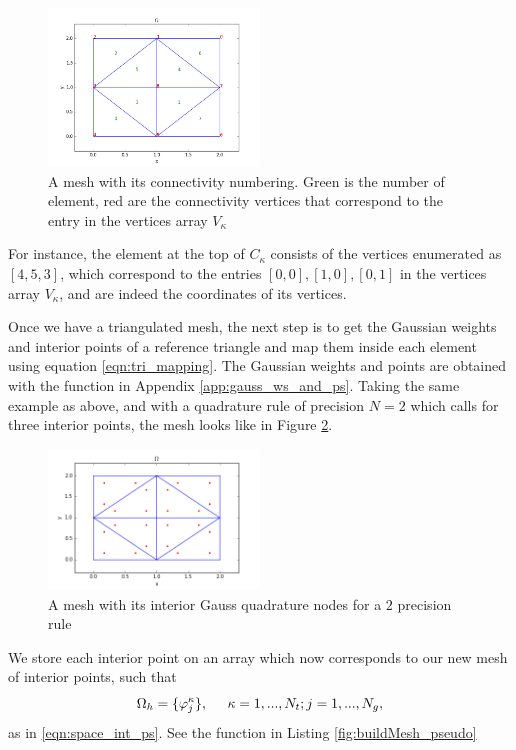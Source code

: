 \documentclass{uonmathreport}
\begin{document}
\begin{figure}[H]
	\begin{center}
		\includegraphics[width=0.5\textwidth]{Figures/Connectivity.png}
	\end{center}
	\caption{A mesh with its connectivity numbering. Green is the number of element, red are the connectivity vertices that correspond to the entry in the vertices array $V_{\kappa}$}
	\label{fig:connectivity}
\end{figure}
For instance, the element at the top of $C_{\kappa}$ consists of the vertices enumerated as $[4,5,3]$, which correspond to the entries $[0,0],[1,0],[0,1]$ in the vertices array $V_{\kappa}$, and are indeed the coordinates of its vertices.

Once we have a triangulated mesh, the next step is to get the Gaussian weights and interior points of a reference triangle and map them inside each element using equation \ref{eqn:tri_mapping}. The Gaussian weights and points are obtained with the function in Appendix \ref{app:gauss_ws_and_ps}. Taking the same example as above, and with a quadrature rule of precision $N=2$ which calls for three interior points, the mesh looks like in Figure \ref{fig:int_points}.
\begin{figure}[H]
	\begin{center}
		\includegraphics[width=0.5\textwidth]{Figures/interior_points.png}
	\end{center}
	\caption{A mesh with its interior Gauss quadrature nodes for a $2$ precision rule}
	\label{fig:int_points}
\end{figure}
We store each interior point on an array which now corresponds to our new mesh of interior points, such that
\begin{equation}
\Omega_h = \{\varphi^{\kappa}_j\}, \hspace{5mm} \kappa = 1,...,N_t; j=1,...,N_g,
\end{equation}
as in \ref{eqn:space_int_ps}. See the function in Listing \ref{fig:buildMesh_pseudo}
\end{document}
